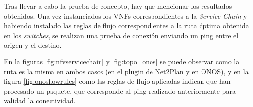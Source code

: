 Tras llevar a cabo la prueba de concepto, hay que mencionar los resultados obtenidos. Una vez instanciados los \acp{VNF} correspondientes a la \textit{Service Chain} y habiendo instalado las reglas de flujo correspondientes a la ruta óptima obtenida en los \textit{switches}, se realizan una prueba de conexión enviando un ping entre el origen y el destino. 

En la figuras \ref{fig:nfvservicechain} y \ref{fig:topo_onos} se puede observar como la ruta es la misma en ambos casos (en el plugin de Net2Plan y en \ac{ONOS}), y en la figura \ref{fig:onosflowrules} como las reglas de flujo aplicadas indican que han procesado un paquete, que corresponde al ping realizado anteriormente para validad la conectividad.

